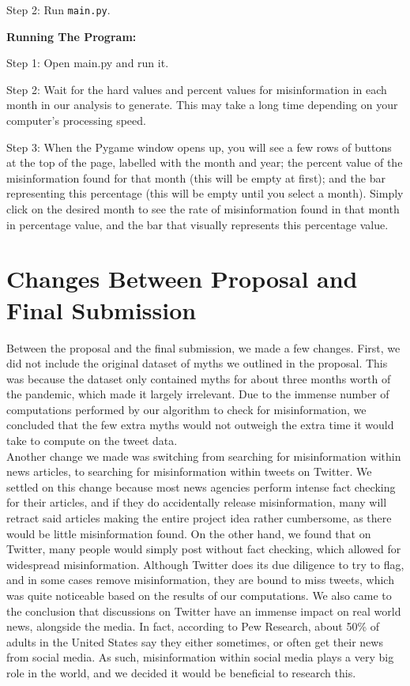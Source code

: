 \documentclass[fontsize=11pt]{article}
\begin{document}
\begin{flushleft}
        Step 2: Run \texttt{main.py}.
        \hfill\break

        \textbf{Running The Program:}

        Step 1: Open main.py and run it.
        \hfill\break

        Step 2: Wait for the hard values and percent values for misinformation in each month in our analysis to generate. This may take a long time depending on your computer's processing speed.
        \hfill\break

        Step 3: When the Pygame window opens up, you will see a few rows of buttons at the top of the page, labelled with the month and year; the percent value of the misinformation found for that month (this will be empty at first); and the bar representing this percentage (this will be empty until you select a month). Simply click on the desired month to see the rate of misinformation found in that month in percentage value, and the bar that visually represents this percentage value.


    \end{flushleft}


    \section*{Changes Between Proposal and Final Submission}
    Between the proposal and the final submission, we made a few changes. First, we did not include the original dataset of myths we outlined in the proposal. This was because the dataset only contained myths for about three months worth of the pandemic, which made it largely irrelevant. Due to the immense number of computations performed by our algorithm to check for misinformation, we concluded that the few extra myths would not outweigh the extra time it would take to compute on the tweet data. \\
    Another change we made was switching from searching for misinformation within news articles, to searching for misinformation within tweets on Twitter. We settled on this change because most news agencies perform intense fact checking for their articles, and if they do accidentally release misinformation, many will retract said articles making the entire project idea rather cumbersome, as there would be little misinformation found. On the other hand, we found that on Twitter, many people would simply post without fact checking, which allowed for widespread misinformation. Although Twitter does its due diligence to try to flag, and in some cases remove misinformation, they are bound to miss tweets, which was quite noticeable based on the results of our computations. We also came to the conclusion that discussions on Twitter have an immense impact on real world news, alongside the media. In fact, according to Pew Research, about 50\% of adults in the United States say they either sometimes, or often get their news from social media. As such, misinformation within social media plays a very big role in the world, and we decided it would be beneficial to research this.
\end{document}
